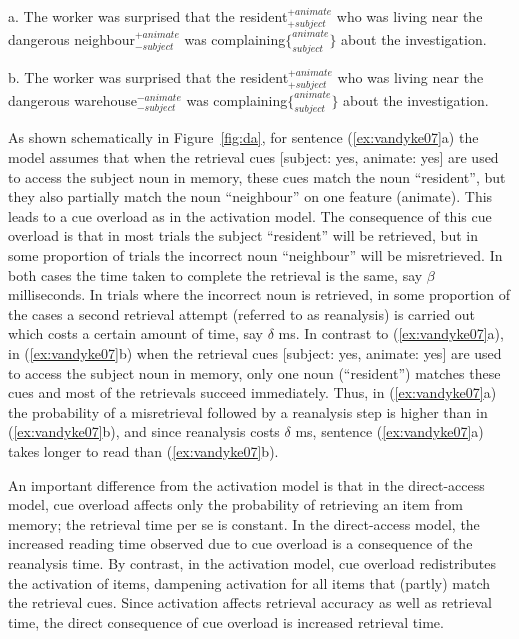 \documentclass{cambridge7A}\usepackage[]{graphicx}\usepackage[]{color}
\begin{document}
\begin{exe}
\ex \label{ex:vandyke07}
\begin{xlist}
\item[a.]
The worker was surprised that the resident$^{+animate}_{+subject}$ who was living near the dangerous neighbour$^{+animate}_{-subject}$ was complaining$\{^{animate}_{subject}\}$ about the investigation.
\item[b.]
The worker was surprised that the resident$^{+animate}_{+subject}$ who was living near the dangerous warehouse$^{-animate}_{-subject}$ was complaining$\{^{animate}_{subject}\}$ about the investigation.
\end{xlist}
\end{exe}

As shown schematically in Figure~\ref{fig:da}, for sentence (\ref{ex:vandyke07}a) the model assumes that when the retrieval cues [subject: yes, animate: yes] are used to access the subject noun in memory, these cues match the noun ``resident'', but they also partially match the noun ``neighbour'' on one feature (animate). This leads to a  cue overload as in the activation model. The consequence of this cue overload is that in most trials the subject ``resident'' will be retrieved, but in some proportion of trials the incorrect noun ``neighbour'' will be misretrieved. In both cases the time taken to complete the retrieval is the same, say $\beta$ milliseconds. In trials where the incorrect noun is retrieved, in some proportion of the cases a second retrieval attempt (referred to as reanalysis) is carried out which costs a certain amount of time, say $\delta$ ms. In contrast to (\ref{ex:vandyke07}a), in (\ref{ex:vandyke07}b)  when the retrieval cues [subject: yes, animate: yes] are used to access the subject noun in memory, only one noun (``resident'') matches these cues and most of the retrievals succeed immediately. Thus, in (\ref{ex:vandyke07}a) the probability of a misretrieval followed by a reanalysis step is higher than in (\ref{ex:vandyke07}b), and since reanalysis costs $\delta$ ms, sentence (\ref{ex:vandyke07}a) takes longer to read than (\ref{ex:vandyke07}b). 

An important difference from the activation model is that in the direct-access model, cue overload affects only the probability of retrieving an item from memory; the  retrieval time per se is constant. In the direct-access model, the increased reading time observed due to cue overload is a consequence of the reanalysis time. 
By contrast, in the activation model, cue overload redistributes the activation of items, dampening activation for all items that (partly) match the  retrieval cues. Since activation affects retrieval accuracy as well as retrieval time, the direct consequence of cue overload is increased retrieval time. 
\end{document}
